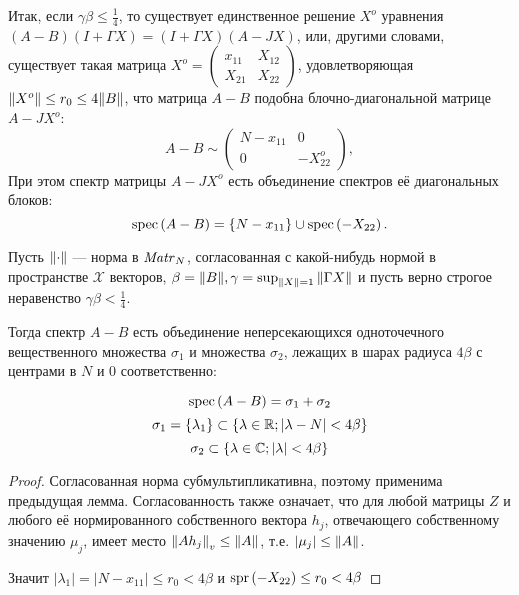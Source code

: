Итак, если \( \gamma\beta \leq \frac14 \),
то существует единственное решение \( X^o \) уравнения
\( (A-B)(I+\Gamma X) = (I+\Gamma X)(A-JX) \),
или, другими словами, существует такая матрица
\( X^o =
\begin{pmatrix}
    x_{11} & X_{12} \\
    X_{21} & X_{22}
\end{pmatrix}
\),
удовлетворяющая \( \norm{X^o} \leq r_0 \leq 4\norm{B} \),
что матрица \( A-B \) подобна блочно-диагональной матрице \( A - JX^o \):
\[
    A-B \sim
    \begin{pmatrix}
        N - x_{11} & 0 \\
        0          & -X_{22}^o
    \end{pmatrix},
    \]
При этом спектр матрицы \( A - JX^o \) есть объединение спектров
её диагональных блоков:
\[ \spec{A-B} = \left\{N - x_{11}\right\} \cup \spec{-X_{22}}. \]

\begin{lemma}
    Пусть \( \norm{\cdot} \) --- норма в \( \matr{N}{} \),
    согласованная с какой-нибудь нормой в пространстве \( \mathscr{X} \) векторов,
    \( \beta = \norm{B}, \gamma=\sup_{\norm{X}=1} \norm{\Gamma X} \)
    и пусть верно строгое неравенство \( \gamma\beta < \frac14 \).

    Тогда спектр \( A - B \)
    есть объединение неперсекающихся одноточечного вещественного множества \( \sigma_1 \)
    и множества \( \sigma_2 \),
    лежащих в шарах радиуса \( 4\beta \)
    с центрами в \( N \) и \( 0 \) соответственно:

    \[ \spec{A-B} = \sigma_1 + \sigma_2 \]
    \[ \sigma_1 = \left\{\lambda_1\right\} \subset \left\{\lambda\in\RR; \lvert \lambda - N\rvert < 4\beta\right\} \]
    \[ \sigma_2 \subset \left\{\lambda\in\CC; \lvert\lambda\rvert <4\beta \right\} \]
\end{lemma}
\begin{proof}
    Согласованная норма субмультипликативна, поэтому применима предыдущая лемма.
    Согласованность также означает, что для любой матрицы \( Z \)
    и любого её нормированного собственного вектора \( h_j \),
    отвечающего собственному значению \( \mu_j \),
    имеет место \({ \normex{v}{A h_j} \leq \norm{A} }\),
    т.е. \({ \lvert \mu_j \rvert \leq \norm{A} }\).

    Значит \( \lvert\lambda_1\rvert = \lvert N - x_{11} \rvert \leq r_0 < 4\beta \)
    и \( \spr{-X_{22}} \leq r_0 < 4\beta  \)
\end{proof}


